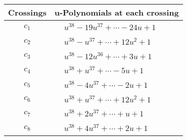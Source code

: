 \documentclass[1p]{elsarticle_modified}
\theoremstyle{definition}
\begin{document}
\begin{tabular}{m{50pt}|m{274pt}}
Crossings & \hspace{64pt}u-Polynomials at each crossing \\
\hline $$\begin{aligned}c_{1}\end{aligned}$$&$\begin{aligned}
&u^{38}-19 u^{37}+\cdots-24 u+1
\end{aligned}$\\
\hline $$\begin{aligned}c_{2}\end{aligned}$$&$\begin{aligned}
&u^{38}- u^{37}+\cdots+12 u^2+1
\end{aligned}$\\
\hline $$\begin{aligned}c_{3}\end{aligned}$$&$\begin{aligned}
&u^{38}-12 u^{36}+\cdots+3 u+1
\end{aligned}$\\
\hline $$\begin{aligned}c_{4}\end{aligned}$$&$\begin{aligned}
&u^{38}+u^{37}+\cdots-5 u+1
\end{aligned}$\\
\hline $$\begin{aligned}c_{5}\end{aligned}$$&$\begin{aligned}
&u^{38}-4 u^{37}+\cdots-2 u+1
\end{aligned}$\\
\hline $$\begin{aligned}c_{6}\end{aligned}$$&$\begin{aligned}
&u^{38}+u^{37}+\cdots+12 u^2+1
\end{aligned}$\\
\hline $$\begin{aligned}c_{7}\end{aligned}$$&$\begin{aligned}
&u^{38}+2 u^{37}+\cdots+u+1
\end{aligned}$\\
\hline $$\begin{aligned}c_{8}\end{aligned}$$&$\begin{aligned}
&u^{38}+4 u^{37}+\cdots+2 u+1
\end{aligned}$\\

\end{tabular}
\end{document}
